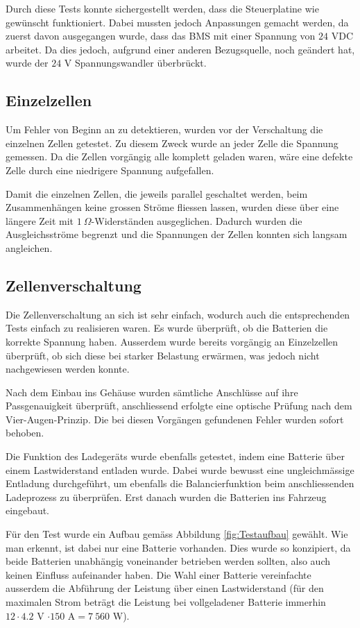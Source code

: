 Durch diese Tests konnte sichergestellt werden, dass die Steuerplatine wie gewünscht funktioniert. Dabei mussten jedoch Anpassungen gemacht werden, da zuerst davon ausgegangen wurde, dass das BMS mit einer Spannung von $24$ VDC arbeitet. Da dies jedoch, aufgrund einer anderen Bezugsquelle, noch geändert hat, wurde der $24$ V Spannungswandler überbrückt.

\subsection{Einzelzellen}
Um Fehler von Beginn an zu detektieren, wurden vor der Verschaltung die einzelnen Zellen getestet. Zu diesem Zweck wurde an jeder Zelle die Spannung gemessen. Da die Zellen vorgängig alle komplett geladen waren, wäre eine defekte Zelle durch eine niedrigere Spannung aufgefallen.

Damit die einzelnen Zellen, die jeweils parallel geschaltet werden, beim Zusammenhängen keine grossen Ströme fliessen lassen, wurden diese über eine längere Zeit mit $1\ \Omega$-Widerständen ausgeglichen. Dadurch wurden die Ausgleichsströme begrenzt und die Spannungen der Zellen konnten sich langsam angleichen.

\subsection{Zellenverschaltung}
Die Zellenverschaltung an sich ist sehr einfach, wodurch auch die entsprechenden Tests einfach zu realisieren waren. Es wurde überprüft, ob die Batterien die korrekte Spannung haben. Ausserdem wurde bereits vorgängig an Einzelzellen überprüft, ob sich diese bei starker Belastung erwärmen, was jedoch nicht nachgewiesen werden konnte.

Nach dem Einbau ins Gehäuse wurden sämtliche Anschlüsse auf ihre Passgenauigkeit überprüft, anschliessend erfolgte eine optische Prüfung nach dem Vier-Augen-Prinzip. Die bei diesen Vorgängen gefundenen Fehler wurden sofort behoben.

Die Funktion des Ladegeräts wurde ebenfalls getestet, indem eine Batterie über einem Lastwiderstand entladen wurde. Dabei wurde bewusst eine ungleichmässige Entladung durchgeführt, um ebenfalls die Balancierfunktion beim anschliessenden Ladeprozess zu überprüfen. Erst danach wurden die Batterien ins Fahrzeug eingebaut.

\color{blue}Für den Test wurde ein Aufbau gemäss Abbildung \ref{fig:Testaufbau} gewählt. Wie man erkennt, ist dabei nur eine Batterie vorhanden. Dies wurde so konzipiert, da beide Batterien unabhängig voneinander betrieben werden sollten, also auch keinen Einfluss aufeinander haben. Die Wahl einer Batterie vereinfachte ausserdem die Abführung der Leistung über einen Lastwiderstand (für den maximalen Strom beträgt die Leistung bei vollgeladener Batterie immerhin \linebreak$12\cdot4.2$ V $\cdot 150$ A$=7\ 560$ W).\newpage

